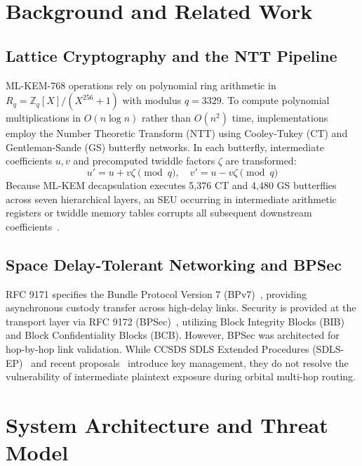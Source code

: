 \documentclass[conference,10pt]{IEEEtran}
\begin{document}
\section{Background and Related Work}
\label{sec:background}

\subsection{Lattice Cryptography and the NTT Pipeline}
ML-KEM-768 operations rely on polynomial ring arithmetic in $R_q = \mathbb{Z}_q[X]/(X^{256} + 1)$ with modulus $q = 3329$. To compute polynomial multiplications in $O(n \log n)$ rather than $O(n^2)$ time, implementations employ the Number Theoretic Transform (NTT) using Cooley-Tukey (CT) and Gentleman-Sande (GS) butterfly networks. In each butterfly, intermediate coefficients $u, v$ and precomputed twiddle factors $\zeta$ are transformed:
\begin{equation}
    u' = u + v\zeta \pmod q, \quad v' = u - v\zeta \pmod q
\end{equation}
Because ML-KEM decapsulation executes 5,376 CT and 4,480 GS butterflies across seven hierarchical layers, an SEU occurring in intermediate arithmetic registers or twiddle memory tables corrupts all subsequent downstream coefficients~\cite{Paul2026NTT,Ravi2023Twiddle}.

\subsection{Space Delay-Tolerant Networking and BPSec}
RFC 9171 specifies the Bundle Protocol Version 7 (BPv7)~\cite{RFC9171_BPv7}, providing asynchronous custody transfer across high-delay links. Security is provided at the transport layer via RFC 9172 (BPSec)~\cite{RFC9172_BPSec}, utilizing Block Integrity Blocks (BIB) and Block Confidentiality Blocks (BCB). However, BPSec was architected for hop-by-hop link validation. While CCSDS SDLS Extended Procedures (SDLS-EP)~\cite{CCSDS_SDLS_EP_355_1_B_1} and recent proposals~\cite{Ledin2026SDLS_DR} introduce key management, they do not resolve the vulnerability of intermediate plaintext exposure during orbital multi-hop routing.

\section{System Architecture and Threat Model}
\label{sec:arch}
\end{document}

